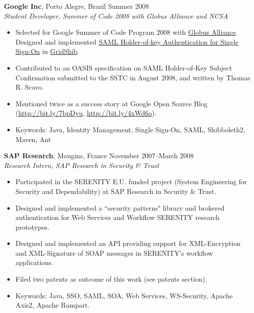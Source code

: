 \documentclass[line,margin]{res}
\begin{document}
\begin{resume}
  \textbf{Google Inc}, Porto Alegre, Brazil \hfill Summer 2008\\
  {\sl Student Developer, Summer of Code 2008 with Globus Alliance and NCSA}
  \begin{itemize}  \itemsep -2pt
  \item Selected for Google Summer of Code Program 2008 with
  \href{http://www.globus.org}{Globus Alliance}. Designed and implemented
  \href{https://web.archive.org/web/20150405141413/https://dev.globus.org/wiki/GSoC08/SAML_Holder_of_Key_Authn_for_HTTP_SSO}{SAML Holder-of-key Authentication for Single Sign-On}
  in \href{http://gridshib.globus.org/}{GridShib}.
  \item Contributed to an OASIS specification on SAML Holder-of-Key Subject Confirmation submitted to the SSTC in August 2008, and written by Thomas R. Scavo.
  \item Mentioned twice as a success story at Google Open Source Blog (\url{http://bit.ly/7bpDyu}, \url{http://bit.ly/4xWd6o}).
  \item Keywords: Java, Identity Management, Single Sign-On, SAML, Shibboleth2, Maven, Ant
  \end{itemize}

  \textbf{SAP Research}, Mougins, France \hfill November 2007--March 2008 \\
  {\sl Research Intern, SAP Research in Security \& Trust}
  \begin{itemize}  \itemsep -2pt
  \item Participated in the SERENITY E.U. funded project (System Engineering for Security and Dependability) at SAP Research in Security \& Trust.
  \item Designed and implemented a ``security patterns" library and brokered authentication for Web Services and Workflow SERENITY research prototypes.
  \item Designed and implemented an API providing support for XML-Encryption and XML-Signature of SOAP messages in SERENITY's workflow applications.
  \item Filed two patents as outcome of this work (see patents section).
  \item Keywords: Java, SSO, SAML, SOA, Web Services, WS-Security, Apache Axis2, Apache Rampart.
  \end{itemize}


\end{resume}
\end{document}
